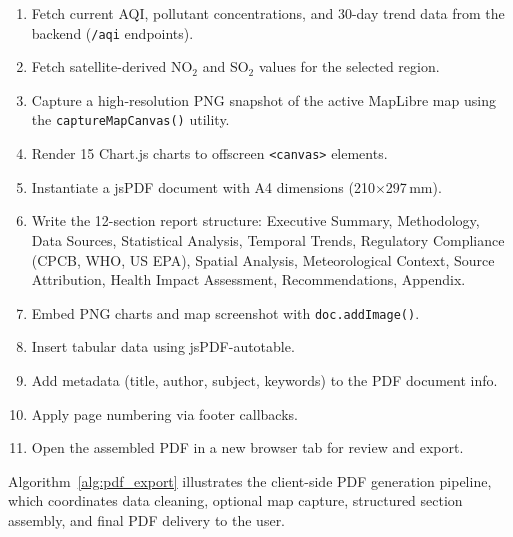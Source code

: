 \documentclass[12pt,a4paper]{article}
\begin{document}
\begin{enumerate}[leftmargin=*]
\item Fetch current AQI, pollutant concentrations, and 30-day trend data from
      the backend (\texttt{/aqi} endpoints).
\item Fetch satellite-derived NO$_2$ and SO$_2$ values for the selected region.
\item Capture a high-resolution PNG snapshot of the active MapLibre map using
      the \texttt{captureMapCanvas()} utility.
\item Render 15 Chart.js charts to offscreen \texttt{<canvas>} elements.
\item Instantiate a jsPDF document with A4 dimensions (210$\times$297\,mm).
\item Write the 12-section report structure: Executive Summary, Methodology,
      Data Sources, Statistical Analysis, Temporal Trends, Regulatory
      Compliance (CPCB, WHO, US EPA), Spatial Analysis, Meteorological Context,
      Source Attribution, Health Impact Assessment, Recommendations, Appendix.
\item Embed PNG charts and map screenshot with \texttt{doc.addImage()}.
\item Insert tabular data using jsPDF-autotable.
\item Add metadata (title, author, subject, keywords) to the PDF document info.
\item Apply page numbering via footer callbacks.
\item Open the assembled PDF in a new browser tab for review and export.
\end{enumerate}

Algorithm~\ref{alg:pdf_export} illustrates the client-side PDF generation pipeline, which coordinates data cleaning, optional map capture, structured section assembly, and final PDF delivery to the user.
\end{document}
